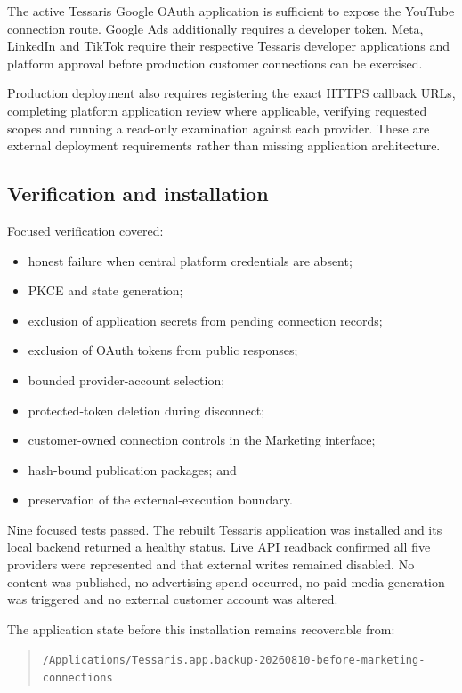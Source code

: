 The active Tessaris Google OAuth application is sufficient to expose the YouTube connection route. Google Ads additionally requires a developer token. Meta, LinkedIn and TikTok require their respective Tessaris developer applications and platform approval before production customer connections can be exercised.

Production deployment also requires registering the exact HTTPS callback URLs, completing platform application review where applicable, verifying requested scopes and running a read-only examination against each provider. These are external deployment requirements rather than missing application architecture.

\subsection{Verification and installation}

Focused verification covered:

\begin{itemize}
    \item honest failure when central platform credentials are absent;
    \item PKCE and state generation;
    \item exclusion of application secrets from pending connection records;
    \item exclusion of OAuth tokens from public responses;
    \item bounded provider-account selection;
    \item protected-token deletion during disconnect;
    \item customer-owned connection controls in the Marketing interface;
    \item hash-bound publication packages; and
    \item preservation of the external-execution boundary.
\end{itemize}

Nine focused tests passed. The rebuilt Tessaris application was installed and its local backend returned a healthy status. Live API readback confirmed all five providers were represented and that external writes remained disabled. No content was published, no advertising spend occurred, no paid media generation was triggered and no external customer account was altered.

The application state before this installation remains recoverable from:

\begin{quote}
\texttt{/Applications/Tessaris.app.backup-20260810-before-marketing-connections}
\end{quote}

